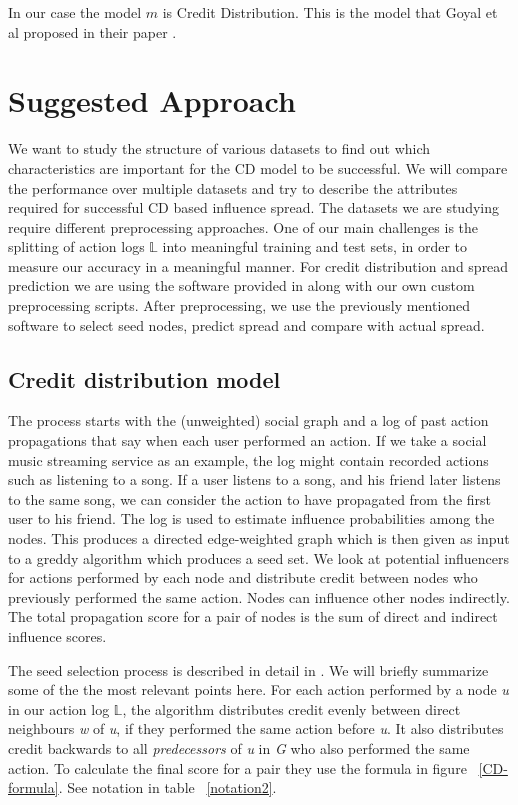\documentclass{acm_proc_article-sp}
\begin{document}
In our case the model $m$ is Credit Distribution. This is the model that Goyal et al proposed in their paper \cite{goyal:datainfluence}.



\section{Suggested Approach}

We want to study the structure of various datasets to find out which characteristics are important for the CD model to be successful. We will compare the performance over multiple datasets and try to describe the attributes required for successful CD based influence spread. The datasets we are studying require different preprocessing approaches. One of our main challenges is the splitting of action logs $\mathbb{L}$ into meaningful training and test sets, in order to measure our accuracy in a meaningful manner. For credit distribution and spread prediction we are using the software provided in \cite{goyal:datainfluence} along with our own custom preprocessing scripts. After preprocessing, we use the previously mentioned software to select seed nodes, predict spread and compare with actual spread.

\subsection{Credit distribution model}

The process starts with the (unweighted) social graph and a log of past action propagations that say when each user performed an action. If we take a social music streaming service as an example, the log might contain recorded actions such as listening to a song. If a user listens to a song, and his friend later listens to the same song, we can consider the action to have propagated from the first user to his friend. The log is used to estimate influence probabilities among the nodes. This produces a directed edge-weighted graph which is then given as input to a greddy algorithm which produces a seed set. We look at potential influencers for actions performed by each node and distribute credit between nodes who previously performed the same action. Nodes can influence other nodes indirectly. The total propagation score for a pair of nodes is the sum of direct and indirect influence scores.

The seed selection process is described in detail in \cite{goyal:datainfluence}. We will briefly summarize some of the the most relevant points here. For each action performed by a node \textit{u} in our action log $\mathbb{L}$, the algorithm distributes credit evenly between direct neighbours \textit{w} of \textit{u}, if they performed the same action before \textit{u}. It also distributes credit backwards to all \textit{predecessors} of \textit{u} in \textit{G} who also performed the same action. To calculate the final score for a pair they use the formula in figure ~\ref{CD-formula}. See notation in table ~\ref{notation2}.
\end{document}
